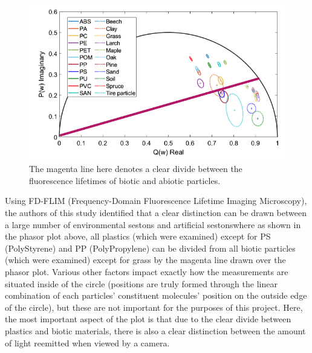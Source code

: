 \documentclass[fleqn,10pt]{SelfArx} %
\begin{document}
	\begin{figure}[h]
		\centering
		\includegraphics[width=1\linewidth]{Figures/PhasorAnnotated.png}
		\caption[Annotated: Phasor Plot \textemdash MPs and Organics]{The magenta line here denotes a clear divide between the fluorescence lifetimes of biotic and abiotic particles.}
		\label{fig:PhasorAnnotated}
	\end{figure}
	
	Using FD-FLIM (Frequency-Domain Fluorescence Lifetime Imaging Microscopy), the authors of this study identified that a clear distinction can be drawn between a large number of environmental sestons and artificial sestons\textemdash where as shown in the phasor plot above, all plastics (which were examined) except for PS (PolyStyrene) and PP (PolyPropylene) can be divided from all biotic particles (which were examined) except for grass by the magenta line drawn over the phasor plot. Various other factors impact exactly how the measurements are situated inside of the circle (positions are truly formed through the linear combination of each particles’ constituent molecules’ position on the outside edge of the circle), but these are not important for the purposes of this project. Here, the most important aspect of the plot is that due to the clear divide between plastics and biotic materials, there is also a clear distinction between the amount of light reemitted when viewed by a camera. 
	
\end{document}
